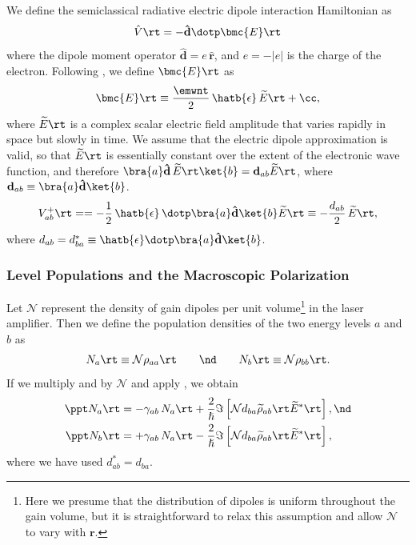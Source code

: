We define the semiclassical radiative electric dipole interaction Hamiltonian as
 \begin{equation} \label{eqn:tls_interaction_h_op_def}
\hat{V}\rt = -\mathbf{\hat{d}} \dotp \bmc{E}\rt
 \end{equation}
where the dipole moment operator $\mathbf{\hat{d}} = e\, \mathbf{\hat{r}}$, and $e = -|e|$ is the charge of the electron. Following , we define $\bmc{E}\rt$ as
 \begin{equation} \label{eqn:bmc_e_def_2}
 \bmc{E}\rt \equiv \frac{\emwnt}{2}\, \hatb{\epsilon}\, \widetilde{E}\rt + \cc ,
 \end{equation}
where $\widetilde{E}\rt$ is a complex scalar electric field amplitude that varies rapidly in space but slowly in time. We assume that the electric dipole approximation is valid, so that $\widetilde{E}\rt$ is essentially constant over the extent of the electronic wave function, and therefore $\bra{a} \mathbf{\hat{d}}\, \widetilde{E}\rt \ket{b} = \mathbf{d}_{a b} \widetilde{E}\rt$, where $\mathbf{d}_{a b} \equiv \bra{a} \mathbf{\hat{d}} \ket{b}$.
 \begin{equation} \label{eqn:tls_oab_def}
V^+_{ab}\rt = = -\frac{1}{2}\, \hatb{\epsilon}\, \dotp \bra{a} \mathbf{\hat{d}} \ket{b} \widetilde{E}\rt \equiv -\frac{d_{a b}}{2}\, \widetilde{E}\rt ,
 \end{equation}
where $d_{a b} = d_{b a}^\ast \equiv \hatb{\epsilon} \dotp \bra{a} \mathbf{\hat{d}} \ket{b}$.

 \subsubsection{Level Populations and the Macroscopic Polarization}
Let $\mathcal{N}$ represent the density of gain dipoles per unit volume\footnote{Here we presume that the distribution of dipoles is uniform throughout the gain volume, but it is straightforward to relax this assumption and allow $\mathcal{N}$ to vary with $\mathbf{r}$.} in the laser amplifier. Then we define the population densities of the two energy levels $a$ and $b$ as
 \begin{equation} \label{eqn:tls_pop_def}
 N_a\rt \equiv \mathcal{N} \rho_{a a}\rt \qquad \nd \qquad N_b\rt \equiv \mathcal{N} \rho_{b b}\rt .
 \end{equation}
If we multiply  and  by $\mathcal{N}$ and apply , we obtain
 \begin{subequations} \label{eqn:tls_dmem_rwa_pop}
 \begin{align}
\label{eqn:tls_dmem_rwa_pop_a} \ppt N_a\rt &= -\gamma_{a b}\, N_a\rt + \frac{2}{\hslash} \Im \left[ \mathcal{N} d_{b a} \widetilde{\rho}_{a b}\rt \widetilde{E}^\ast\rt \right] , \nd \\
\label{eqn:tls_dmem_rwa_pop_b} \ppt N_b\rt &= +\gamma_{a b}\, N_a\rt - \frac{2}{\hslash} \Im \left[ \mathcal{N} d_{b a} \widetilde{\rho}_{a b}\rt \widetilde{E}^\ast\rt \right] ,
 \end{align}
 \end{subequations}
where we have used $d_{a b}^\ast = d_{b a}$.

